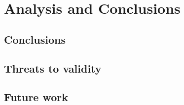 \chapter{Analysis and Conclusions}
\label{analysis}

\section{Conclusions}

\section{Threats to validity}
\begin{comment}
* Is the Ohloh database a representation of the world of OSS projects?
* Is LOC as the sum of source lines of code, comments, and blank lines valid?
* The use of LOC as a measure of project evolution. Does it represent
activity/growth/whatever to say something about the project's status?
* A selection criterion for the projects was a continuous series of subsequent
monthly facts. Maybe the full series of evolution data of a project is needed in
order to find objective signs or to be able to compare different projects.
* Is 250 projects enough to detect patterns and generalise to the world of OSS
projects?
* Is monthly aggregated data fine-grained enough?

\end{comment}

\section{Future work}


